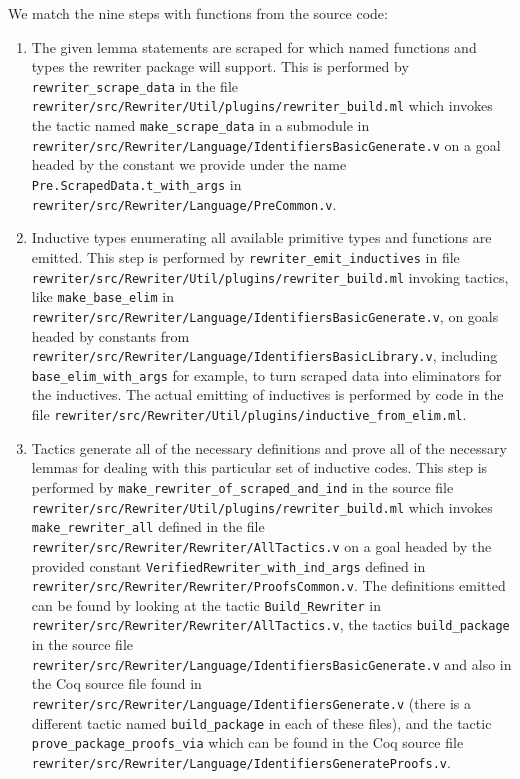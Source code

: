 \begin{subappendices}
We match the nine steps with functions from the source code:
\begin{enumerate}
  \item
    The given lemma statements are scraped for which named functions and types the rewriter package will support.
    This is performed by \texttt{rewriter\_scrape\_data} in the file \texttt{rewriter/src/Rewriter/Util/plugins/rewriter\_build.ml} which invokes the tactic named \texttt{make\_scrape\_data} in a submodule in \texttt{rewriter/src/Rewriter/Language/IdentifiersBasicGenerate.v} on a goal headed by the constant we provide under the name \texttt{Pre.ScrapedData.t\_with\_args} in \texttt{rewriter/src/Rewriter/Language/PreCommon.v}.
  \item
    Inductive types enumerating all available primitive types and functions are emitted.
    This step is performed by \texttt{rewriter\_emit\_inductives} in file \texttt{rewriter/src/Rewriter/Util/plugins/rewriter\_build.ml} invoking tactics, like \texttt{make\_base\_elim} in \texttt{rewriter/src/Rewriter/Language/IdentifiersBasicGenerate.v}, on goals headed by constants from \texttt{rewriter/src/Rewriter/Language/IdentifiersBasicLibrary.v}, including \texttt{base\_elim\_with\_args} for example, to turn scraped data into eliminators for the inductives.
    The actual emitting of inductives is performed by code in the file \texttt{rewriter/src/Rewriter/Util/plugins/inductive\_from\_elim.ml}.
  \item
    Tactics generate all of the necessary definitions and prove all of the necessary lemmas for dealing with this particular set of inductive codes.
    This step is performed by \texttt{make\_rewriter\_of\_scraped\_and\_ind} in the source file \texttt{rewriter/src/Rewriter/Util/plugins/rewriter\_build.ml} which invokes \texttt{make\_rewriter\_all} defined in the file \texttt{rewriter/src/Rewriter/Rewriter/AllTactics.v} on a goal headed by the provided constant \texttt{VerifiedRewriter\_with\_ind\_args} defined in \texttt{rewriter/src/Rewriter/Rewriter/ProofsCommon.v}.
    The definitions emitted can be found by looking at the tactic \texttt{Build\_Rewriter} in \texttt{rewriter/src/Rewriter/Rewriter/AllTactics.v}, the tactics \texttt{build\_package} in the source file \texttt{rewriter/src/Rewriter/Language/IdentifiersBasicGenerate.v} and also in the Coq source file found in \texttt{rewriter/src/Rewriter/Language/IdentifiersGenerate.v} (there is a different tactic named \texttt{build\_package} in each of these files), and the tactic \texttt{prove\_package\_proofs\_via} which can be found in the Coq source file \texttt{rewriter/src/Rewriter/Language/IdentifiersGenerateProofs.v}.

\end{enumerate}
\end{subappendices}
